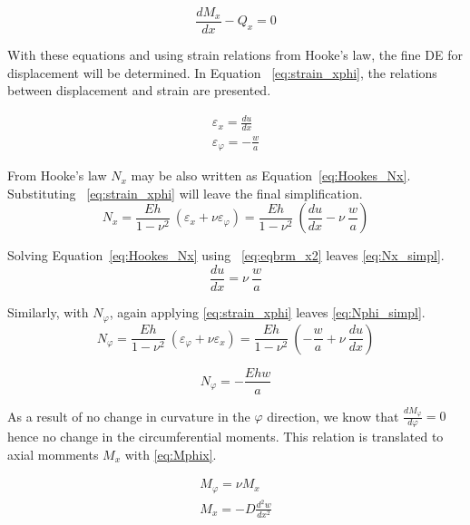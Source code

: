 \begin{equation}
	\label{eq:eqbrm_y2}
	\frac{dM_x}{dx}- Q_x= 0
\end{equation} 

With these equations and using strain relations from Hooke's law, the fine DE for displacement will be determined. In Equation ~\ref{eq:strain_xphi}, the relations between displacement and strain are presented.

\begin{equation}
	\label{eq:strain_xphi}
	\begin{aligned}
		\varepsilon_x = \frac{du}{dx}      \\
		\varepsilon_\varphi = -\frac{w}{a} 
	\end{aligned}
\end{equation}

From Hooke's law $N_x$ may be also written as Equation~\ref{eq:Hookes_Nx}. Substituting ~\ref{eq:strain_xphi} will leave the final simplification.
\begin{equation}
	\label{eq:Hookes_Nx}
	N_x = \frac{Eh}{1-\nu^2}\ \left( \varepsilon_x + \nu \varepsilon_\varphi \right) =  \frac{Eh}{1-\nu^2}\ \left( \frac{du}{dx} -\nu \ \frac{w}{a} \right)
\end{equation} 

Solving Equation~\ref{eq:Hookes_Nx} using ~\ref{eq:eqbrm_x2} leaves \ref{eq:Nx_simpl}.
\begin{equation}
	\label{eq:Nx_simpl}
	\frac{du}{dx} =  \nu \ \frac{w}{a}
\end{equation} 

Similarly, with $N_\varphi$, again applying \ref{eq:strain_xphi} leaves \ref{eq:Nphi_simpl}.
\begin{equation}
	\label{eq:Hookes_Nphi}
	N_\varphi = \frac{Eh}{1-\nu^2}\ \left( \varepsilon_\varphi + \nu \varepsilon_x \right) = \frac{Eh}{1-\nu^2}\  \left( -\frac{w}{a}+\nu \ \frac{du}{dx} \right)
\end{equation} 

\begin{equation}
	\label{eq:Nphi_simpl}
	N_\varphi = - \frac{Ehw}{a}
\end{equation}

As a result of no change in curvature in the $\varphi$ direction, we know that $\frac{dM_\varphi}{d\varphi}= 0$ hence no change in the circumferential moments. This relation is translated to axial momments $M_x$ with \ref{eq:Mphix}.

\begin{equation}
	\label{eq:Mphix}
	\begin{aligned}
		M_\varphi = \nu M_x        \\
		M_x = -D \frac{d^2w}{dx^2} 
	\end{aligned}
\end{equation}

